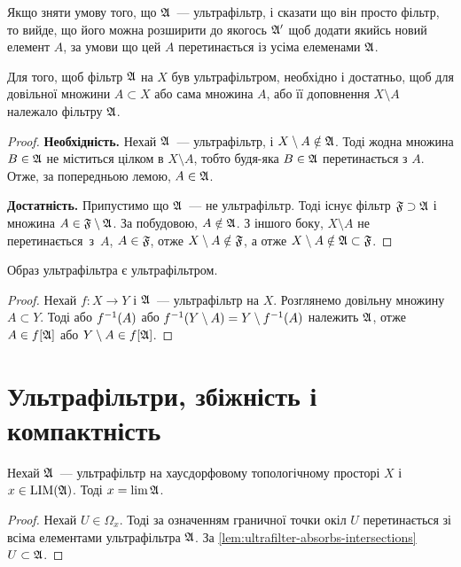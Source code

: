 \begin{remark}
    Якщо зняти умову того, що $\frak A$~--- ультрафільтр, і сказати що він просто фільтр, то вийде, що його можна розширити до якогось $\frak A'$ щоб додати якийсь новий елемент $A$, за умови що цей $A$  перетинається із усіма елеменами $\frak A$.
\end{remark}

\begin{theorem}
    \label{th:ultrafilter-criterion}
    Для того, щоб фільтр $\frak A$ на $X$ був ультрафільтром, необхідно і достатньо, щоб для довільної множини $A \subset X$ або сама множина $A$, або її доповнення $X \setminus A$ належало фільтру $\frak A$.
\end{theorem}
\begin{proof}
    \textbf{Необхідність.} Нехай $\frak A$~--- ультрафільтр, і $X \setminus A \notin \frak A$. Тоді жодна множина $B \in \frak A$ не міститься цілком в $X \setminus A$, тобто будя-яка $B \in \frak A$ перетинається з $A$. Отже, за попередньою лемою, $A \in \frak A$. 
    
    \textbf{Достатність.} Припустимо що $\frak A$~--- не ультрафільтр. Тоді існує фільтр $\frak F \supset \frak A$ і множина $A \in \frak F \setminus \frak A$. За побудовою, $A \notin \frak A$. З іншого боку, $X \setminus A$ не перетинається~з~$A$, $A \in \frak F$, отже $X \setminus A \notin \frak F$, а отже $X \setminus A \notin \frak A \subset \frak F$.
\end{proof}

\begin{corollary}
    \label{crl:ultrafilter-image-is-ultrafilter}
    Образ ультрафільтра є ультрафільтром.
\end{corollary}
\begin{proof}
    Нехай $f: X \to Y$ і $\frak A$~--- ультрафільтр на $X$. Розглянемо довільну множину $A \subset Y$. Тоді або $f\inv (A)$ або $f\inv (Y \setminus A) = Y \setminus f\inv (A)$ належить $\frak A$, отже $A \in f[\frak A]$ або $Y \setminus A \in f[\frak A]$.
\end{proof}

\section{Ультрафільтри, збіжність і компактність}

\begin{lemma}
    \label{lem:ultrafilter-limitpoint-is-its-limit}
    Нехай $\frak A$~--- ультрафільтр на хаусдорфовому топологічному просторі $X$ і $x \in \LIM(\frak A)$. Тоді $x = \lim \frak A$.
\end{lemma}
\begin{proof}
    Нехай $U \in \Omega_x$. Тоді за означенням граничної точки окіл $U$ перетинається зі всіма елементами ультрафільтра $\frak A$. За \cref{lem:ultrafilter-absorbs-intersections} $U \subset \frak A$.
\end{proof}


